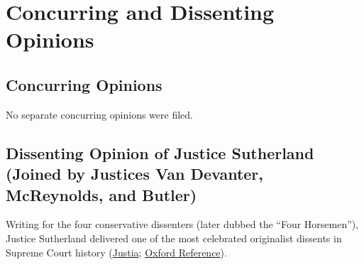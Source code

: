 \documentclass[12pt]{article}
\begin{document}
\section{Concurring and Dissenting Opinions}

\subsection{Concurring Opinions}
No separate concurring opinions were filed.

\subsection{Dissenting Opinion of Justice Sutherland (Joined by Justices Van Devanter, McReynolds, and Butler)}
Writing for the four conservative dissenters (later dubbed the ``Four Horsemen''), Justice Sutherland delivered one of the most celebrated originalist dissents in Supreme Court history (\href{https://supreme.justia.com/cases/federal/us/290/398/}{Justia}; \href{https://www.oxfordreference.com/display/10.1093/oi/authority.20110803095942753}{Oxford Reference}).
\end{document}

